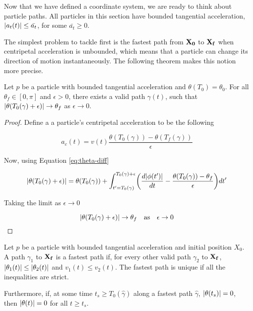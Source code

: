 Now that we have defined a coordinate system, we are ready to think about particle paths. All particles in this section have bounded tangential acceleration, $\abs{a_t(t)} \le \bar{a_t}$, for some $\bar{a_t} \ge 0$.

The simplest problem to tackle first is the fastest path from $\mathbf{X_0}$ to $\mathbf{X_f}$ when centripetal acceleration is unbounded, which means that a particle can change its direction of motion instantaneously. The following theorem makes this notion more precise.

\begin{theorem}\label{thm:theta-choose}
  Let $p$ be a particle with bounded tangential acceleration and $\theta(T_0) = \theta_0$. For all $\theta_f \in [0, \pi]$ and $\epsilon > 0$, there exists a valid path $\gamma(t)$, such that $\abs{\theta(T_0(\gamma) + \epsilon)} \to \theta_f$ as $\epsilon \to 0$.
\end{theorem}
  
\begin{proof}
  Define a a particle's centripetal acceleration to be the following

  \[
      a_c(t) = v(t) \frac{\theta(T_0(\gamma)) - \theta(T_f(\gamma))}{\epsilon}
  \]

  Now, using Equation \ref{eq:theta-diff}

  \[
    \abs{\theta(T_0(\gamma) + \epsilon)} = \theta(T_0(\gamma)) + \int_{t'=T_0(\gamma)}^{T_0(\gamma)+\epsilon} \paren{\frac{d\abs{\phi(t')}}{dt} - \frac{\theta(T_0(\gamma)) - \theta_f}{\epsilon}} dt'
  \]

  Taking the limit as $\epsilon \to 0$

  \[
    \abs{\theta(T_0(\gamma) + \epsilon)} \to \theta_f \quad \text{as} \quad \epsilon \to 0
  \]
\end{proof}

\begin{theorem}\label{thm:theta-min}
  Let $p$ be a particle with bounded tangential acceleration and initial position $X_0$. A path $\gamma_1$ to $\mathbf{X_f}$ is a fastest path if, for every other valid path $\gamma_2$ to $\mathbf{X_f}$, $\abs{\theta_1(t)} \le \abs{\theta_2(t)}$ and $v_1(t) \le v_2(t)$. The fastest path is unique if all the inequalities are strict.

  Furthermore, if, at some time $t_s \ge T_0(\hat{\gamma})$ along a fastest path $\hat{\gamma}$, $\abs{\theta(t_s)} = 0$, then $\abs{\theta(t)} = 0$ for all $t \ge t_s$. 
\end{theorem}

